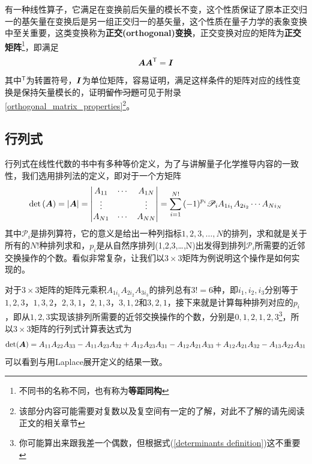 \documentclass[12pt,a4paper,openany,twoside]{book}
\numberwithin{equation}{section}
\begin{document}
          有一种线性算子，它满足在变换前后矢量的模长不变，这个性质保证了原本正交归一的基矢量在变换后是另一组正交归一的基矢量，这个性质在量子力学的表象变换中至关重要，这类变换称为\textbf{正交(orthogonal)变换}，正交变换对应的矩阵为\textbf{正交矩阵}\footnote{不同书的名称不同，也有称为\textbf{等距同构}}，即满足
          \begin{equation}
            \vb*{A}\vb*{A}^\mathsf{T}=\vb*{I}
          \end{equation}
          其中$^\mathsf{T}$为转置符号，$\vb*{I}$为单位矩阵，容易证明，满足这样条件的矩阵对应的线性变换是保持矢量模长的，证明\sout{留作习题}可见于附录\ref{orthogonal_matrix_properties}\footnote{该部分内容可能需要对复数以及复空间有一定的了解，对此不了解的请先阅读正文的相关章节}。

        \subsection{行列式}
          行列式在线性代数的书中有多种等价定义，为了与讲解量子化学推导内容的一致性，我们选用排列法的定义，即对于一个方矩阵
          \begin{equation}
            \det\qty(\vb*{A})=\abs{\vb*{A}}=\mdet{
              A_{11} & \cdots & A_{1 N} \\
              \vdots & {} & \vdots \\
              A_{N 1} & \cdots & A_{N N}
            }=\sum_{i=1}^{N !}{\qty(-1)^{p_i} \mathscr{P}_i A_{1i_1} A_{2i_2} \cdots A_{N i_N}}
            \label{determinants definition}
          \end{equation}
          其中$\mathscr{P}_i$是排列算符，它的意义是给出一种列指标$1,2,3,\dots,N$的排列，求和就是关于所有的$N!$种排列求和，$p_i$是从自然序排列(1,2,3,\dots,N)出发得到排列$\mathscr{P}_i$所需要的近邻交换操作的个数。看似非常复杂，让我们以$3\times3$矩阵为例说明这个操作是如何实现的。

          对于$3\times3$矩阵的矩阵元乘积$A_{1i_1} A_{2i_2}A_{3i_3}$的排列总有$3!=6$种，即$i_1,i_2,i_3$分别等于$1,2,3$，$1,3,2$，$2,3,1$，$2,1,3$，$3,1,2$和$3,2,1$，接下来就是计算每种排列对应的$p_i$，即从$1,2,3$实现该排列所需要的近邻交换操作的个数，分别是$0,1,2,1,2,3$\footnote{你可能算出来跟我差一个偶数，但根据式(\ref{determinants definition})这不重要}，所以$3\times3$矩阵的行列式计算表达式为
          \begin{equation}
            \det(\vb*{A})=A_{11} A_{22}A_{33}-A_{11} A_{23}A_{32}+A_{12} A_{23}A_{31}-A_{12} A_{21}A_{33}+A_{12} A_{21}A_{32}-A_{13} A_{22}A_{31}
          \end{equation}
          可以看到与用Laplace展开定义的结果一致。
\end{document}
